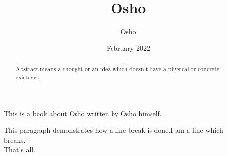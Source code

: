 \documentclass[12pt , letter paper]{article}
\title{Osho}
\author[]{Osho}
\date{February 2022}
\begin{document}
\begin{titlepag}
\maketitle
\end{titlepag}
This is a book about Osho written by Osho himself.
\begin{abstract}
    Abstract means a thought or an idea which doesn't have a physical or concrete existence.
\end{abstract}
\begin{line break}
This paragraph demonstrates how a line break is done.I am a line which\\  breaks.\\ That's all.
\end{line break}
\end{document}
